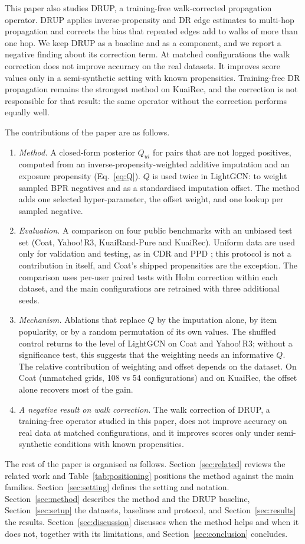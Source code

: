 This paper also studies DRUP, a training-free walk-corrected propagation operator. DRUP
applies inverse-propensity and DR edge
estimates to multi-hop propagation and corrects the bias that repeated edges add to
walks of more than one hop. We keep DRUP as a baseline and as a component, and we
report a negative finding about its correction term. At matched configurations the
walk correction does not improve accuracy on the real datasets. It improves score
values only in a semi-synthetic setting with known propensities. Training-free DR
propagation remains the strongest method on KuaiRec, and the correction is not
responsible for that result: the same operator without the correction performs
equally well.

The contributions of the paper are as follows.
\begin{enumerate}
\item \emph{Method.} A closed-form posterior $Q_{ui}$ for pairs that are not logged
positives, computed from an inverse-propensity-weighted additive imputation and an
exposure propensity (Eq.~\eqref{eq:Q}). $Q$ is used twice in LightGCN: to weight
sampled BPR negatives and as a standardised imputation offset. The method adds one
selected hyper-parameter, the offset weight, and one lookup per sampled negative.
\item \emph{Evaluation.} A comparison on four public benchmarks with an unbiased test
set (Coat, Yahoo!\,R3, KuaiRand-Pure and KuaiRec). Uniform data are used only for
validation and testing, as in CDR \citep{song2023cdr} and PPD \citep{islam2026ppd}; this protocol is not a contribution in itself, and Coat's shipped propensities are the exception. The comparison uses per-user paired tests with Holm
correction within each dataset, and the main configurations are retrained with three
additional seeds.
\item \emph{Mechanism.} Ablations that replace $Q$ by the imputation alone, by item
popularity, or by a random permutation of its own values. The shuffled control
returns to the level of LightGCN on Coat and Yahoo!\,R3; without a significance test, this suggests that the weighting needs an
informative $Q$. The relative contribution of weighting and offset depends on the
dataset. On Coat (unmatched grids, 108 vs 54 configurations) and on KuaiRec, the offset alone
recovers most of the gain.
\item \emph{A negative result on walk correction.} The walk correction of DRUP, a
training-free operator studied in this paper, does not improve accuracy on real data at matched configurations, and it improves
scores only under semi-synthetic conditions with known propensities.
\end{enumerate}

The rest of the paper is organised as follows. Section~\ref{sec:related} reviews the
related work and Table~\ref{tab:positioning} positions the method against the main
families. Section~\ref{sec:setting} defines the setting and notation. Section~\ref{sec:method}
describes the method and the DRUP baseline, Section~\ref{sec:setup} the datasets,
baselines and protocol, and Section~\ref{sec:results} the results. Section~\ref{sec:discussion}
discusses when the method helps and when it does not, together with its limitations,
and Section~\ref{sec:conclusion} concludes.
